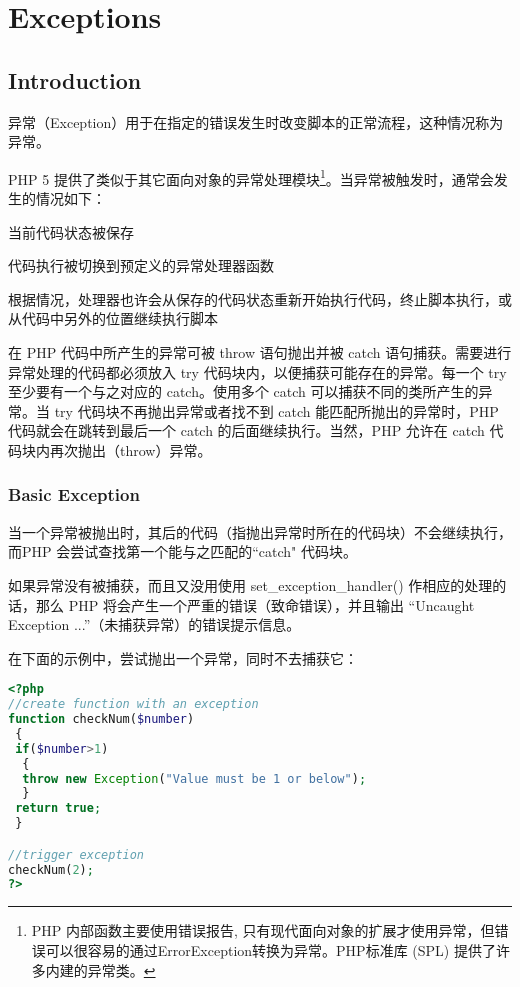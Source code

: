 \part{Exceptions}




\chapter{Introduction}

异常（Exception）用于在指定的错误发生时改变脚本的正常流程，这种情况称为异常。

PHP 5 提供了类似于其它面向对象的异常处理模块\footnote{PHP 内部函数主要使用错误报告, 只有现代面向对象的扩展才使用异常，但错误可以很容易的通过ErrorException转换为异常。PHP标准库 (SPL) 提供了许多内建的异常类。}。当异常被触发时，通常会发生的情况如下：

\begin{compactitem}
\item 当前代码状态被保存
\item 代码执行被切换到预定义的异常处理器函数
\item 根据情况，处理器也许会从保存的代码状态重新开始执行代码，终止脚本执行，或从代码中另外的位置继续执行脚本
\end{compactitem}

在 PHP 代码中所产生的异常可被 throw 语句抛出并被 catch 语句捕获。需要进行异常处理的代码都必须放入 try 代码块内，以便捕获可能存在的异常。每一个 try 至少要有一个与之对应的 catch。使用多个 catch 可以捕获不同的类所产生的异常。当 try 代码块不再抛出异常或者找不到 catch 能匹配所抛出的异常时，PHP 代码就会在跳转到最后一个 catch 的后面继续执行。当然，PHP 允许在 catch 代码块内再次抛出（throw）异常。


\section{Basic Exception}


当一个异常被抛出时，其后的代码（指抛出异常时所在的代码块）不会继续执行，而PHP 会尝试查找第一个能与之匹配的``catch" 代码块。

如果异常没有被捕获，而且又没用使用 set\_exception\_handler() 作相应的处理的话，那么 PHP 将会产生一个严重的错误（致命错误），并且输出 ``Uncaught Exception ...''（未捕获异常）的错误提示信息。



在下面的示例中，尝试抛出一个异常，同时不去捕获它：


\begin{lstlisting}[language=PHP]
<?php
//create function with an exception
function checkNum($number)
 {
 if($number>1)
  {
  throw new Exception("Value must be 1 or below");
  }
 return true;
 }

//trigger exception
checkNum(2);
?>
\end{lstlisting}

